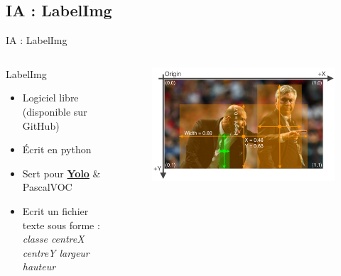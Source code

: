     \subsection{IA : LabelImg}
        \begin{frame}[allowframebreaks]{IA : LabelImg}
            \begin{columns}
                \begin{column}{0.5\textwidth}
                    \begin{block}{LabelImg}
                        \begin{itemize}
            	            [square]
            	            \item Logiciel libre (disponible sur GitHub)
            	            \item Écrit en python
            	            \item Sert pour \textbf{\underline{Yolo}} \& PascalVOC
            	            \item Ecrit un fichier texte sous forme : \textit{classe centreX centreY largeur hauteur}
            	        \end{itemize}
                    \end{block}
                \end{column}\hfill
                \begin{column}{0.5\textwidth}
                    \begin{figure}[H]
                        \centering
                        \includegraphics[width=1\linewidth]{images/exempleImgYolo.png}
                    \end{figure}
                \end{column}
            \end{columns}
            

\end{frame}
